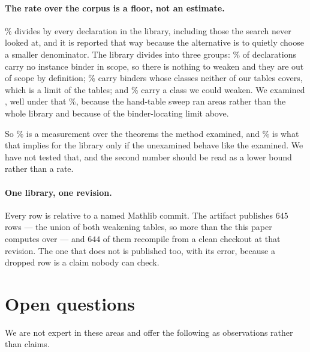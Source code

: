 \documentclass[11pt]{article}
\begin{document}
\paragraph{The rate over the corpus is a floor, not an estimate.}
\mathlibWeakenablePercent{}\% divides \theoremsWeakened{} by every declaration
in the library, including those the search never looked at, and it is reported
that way because the alternative is to quietly choose a smaller denominator.
The library divides into three groups: \noBinderPercent{}\% of declarations
carry no instance binder in scope, so there is nothing to weaken and they are
out of scope by definition; \noTableClassPercent{}\% carry binders whose classes
neither of our tables covers, which is a limit of the tables; and
\reachablePercent{}\% carry a class we could weaken. We examined
\theoremsExamined{}, well under that \reachablePercent{}\%, because the
hand-table sweep ran \allAreasWord{} areas rather than the whole library and
because of the binder-locating limit above.

So \theoremRate{}\% is a measurement over the theorems the method examined, and
\mathlibWeakenablePercent{}\% is what that implies for the library only if the
unexamined behave like the examined. We have not tested that, and the second
number should be read as a lower bound rather than a rate.

\paragraph{One library, one revision.} Every row is relative to a named Mathlib
commit. The artifact publishes \(645\) rows --- the union of both weakening
tables, so more than the \allSurvivors{} this paper computes over --- and
\(644\) of them recompile from a clean checkout at that revision. The one that
does not is published too, with its error, because a dropped row is a claim
nobody can check.

\section{Open questions}\label{sec:questions}

We are not expert in these areas and offer the following as observations rather
than claims.
\end{document}
